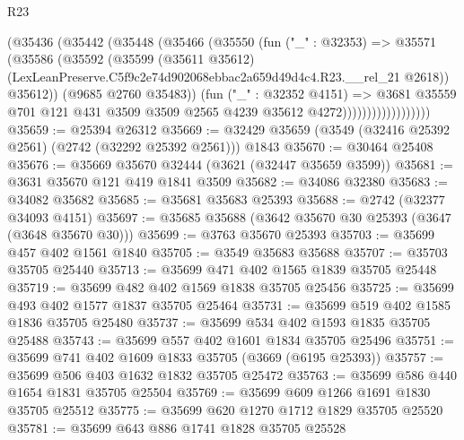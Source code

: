 \begin{lexlean}{R23}
\begin{coremodule}
                            (@35436
                              (@35442
                                (@35448
                                  (@35466
                                    (@35550
                                      (fun ("_" : @32353) =>
                                      @35571
                                        (@35586
                                          (@35592
                                            (@35599
                                              (@35611 @35612)
                                              (LexLeanPreserve.C5f9c2e74d902068ebbac2a659d49d4c4.R23.__rel_21
                                                @2618))
                                            @35612))
                                        (@9685 @2760 @35483))
                                      (fun ("_" : @32352 @4151) =>
                                      @3681
                                        @35559
                                        @701
                                        @121
                                        @431
                                        @3509
                                        @3509
                                        @2565
                                        @4239
                                        @35612
                                        @4272))))))))))))))))))
@35659 := @25394 @26312
@35669 := @32429 @35659 (@3549 (@32416 @25392 @2561) (@2742 (@32292 @25392 @2561))) @1843
@35670 := @30464 @25408
@35676 := @35669 @35670 @32444 (@3621 (@32447 @35659 @3599))
@35681 := @3631 @35670 @121 @419 @1841 @3509
@35682 := @34086 @32380
@35683 := @34082 @35682
@35685 := @35681 @35683 @25393
@35688 := @2742 (@32377 @34093 @4151)
@35697 := @35685 @35688 (@3642 @35670 @30 @25393 (@3647 (@3648 @35670 @30)))
@35699 := @3763 @35670 @25393
@35703 := @35699 @457 @402 @1561 @1840
@35705 := @3549 @35683 @35688
@35707 := @35703 @35705 @25440
@35713 := @35699 @471 @402 @1565 @1839 @35705 @25448
@35719 := @35699 @482 @402 @1569 @1838 @35705 @25456
@35725 := @35699 @493 @402 @1577 @1837 @35705 @25464
@35731 := @35699 @519 @402 @1585 @1836 @35705 @25480
@35737 := @35699 @534 @402 @1593 @1835 @35705 @25488
@35743 := @35699 @557 @402 @1601 @1834 @35705 @25496
@35751 := @35699 @741 @402 @1609 @1833 @35705 (@3669 (@6195 @25393))
@35757 := @35699 @506 @403 @1632 @1832 @35705 @25472
@35763 := @35699 @586 @440 @1654 @1831 @35705 @25504
@35769 := @35699 @609 @1266 @1691 @1830 @35705 @25512
@35775 := @35699 @620 @1270 @1712 @1829 @35705 @25520
@35781 := @35699 @643 @886 @1741 @1828 @35705 @25528

\end{coremodule}
\end{lexlean}
